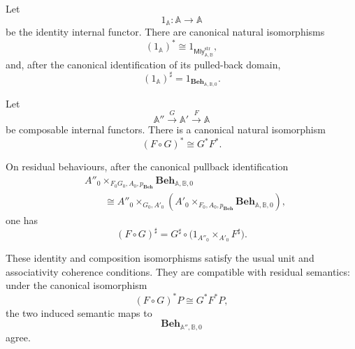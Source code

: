 \begin{proposition}
\label{prop:input-reindexing-coherence}
    Let
    \[
        1_{\mathbb A}:\mathbb A\to\mathbb A
    \]
    be the identity internal functor. There are canonical natural
    isomorphisms
    \[
        (1_{\mathbb A})^*
        \cong
        1_{
            \mathsf{Mly}^{\mathrm{str}}_{\mathbb A,\mathbb B}
        },
    \]
    and, after the canonical identification of its pulled-back domain,
    \[
        (1_{\mathbb A})^\sharp
        =
        1_{\mathbf{Beh}_{\mathbb A,\mathbb B,0}}.
    \]

    Let
    \[
        \mathbb A''
        \xrightarrow{G}
        \mathbb A'
        \xrightarrow{F}
        \mathbb A
    \]
    be composable internal functors. There is a canonical natural
    isomorphism
    \[
        (F\circ G)^*
        \cong
        G^*F^*.
    \]

    On residual behaviours, after the canonical pullback identification
    \[
    \begin{aligned}
        &
        A''_0
        \times_{F_0G_0,A_0,p_{\mathbf{Beh}}}
        \mathbf{Beh}_{\mathbb A,\mathbb B,0}
        \\
        &\qquad\cong
        A''_0
        \times_{G_0,A'_0}
        \left(
            A'_0
            \times_{F_0,A_0,p_{\mathbf{Beh}}}
            \mathbf{Beh}_{\mathbb A,\mathbb B,0}
        \right),
    \end{aligned}
    \]
    one has
    \[
        (F\circ G)^\sharp
        =
        G^\sharp
        \circ
        \bigl(
            1_{A''_0}\times_{A'_0}F^\sharp
        \bigr).
    \]

    These identity and composition isomorphisms satisfy the usual unit and
    associativity coherence conditions. They are compatible with residual
    semantics: under the canonical isomorphism
    \[
        (F\circ G)^*P\cong G^*F^*P,
    \]
    the two induced semantic maps to
    \[
        \mathbf{Beh}_{\mathbb A'',\mathbb B,0}
    \]
    agree.
\end{proposition}

